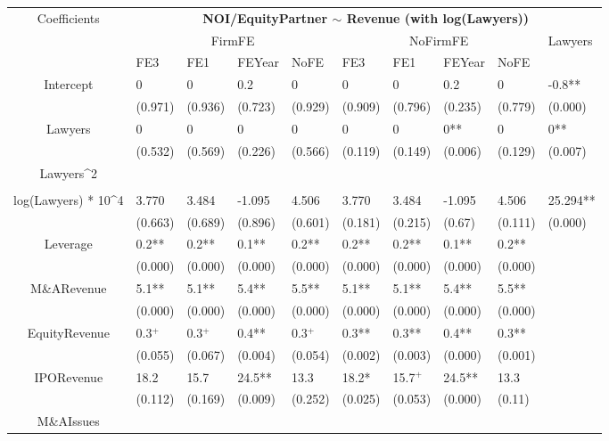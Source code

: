 \documentclass{article}
\begin{document}
\begin{table}[H]
\centering
\begin{tabular}{|clllllllll|}
\hline
\multirow{3}{*}{Coefficients} & \multicolumn{9}{c|}{\textbf{NOI/EquityPartner $\sim$ Revenue (with log(Lawyers))}} \\
\cline{2-10}
& \multicolumn{4}{c}{FirmFE} & \multicolumn{4}{c}{NoFirmFE} & \multirow{2}{*}{Lawyers} \\
\cline{2-9}
& FE3 & FE1 & FEYear & NoFE & FE3 & FE1 & FEYear & NoFE &  \\
\hline
 
Intercept & 0 & 0 & 0.2 & 0 & 0 & 0 & 0.2 & 0 & -0.8** \\ 
   & (0.971) & (0.936) & (0.723) & (0.929) & (0.909) & (0.796) & (0.235) & (0.779) & (0.000) \\ 
  Lawyers & 0 & 0 & 0 & 0 & 0 & 0 & 0** & 0 & 0** \\ 
   & (0.532) & (0.569) & (0.226) & (0.566) & (0.119) & (0.149) & (0.006) & (0.129) & (0.007) \\ 
  Lawyers^2 &  &  &  &  &  &  &  &  &  \\ 
   &  &  &  &  &  &  &  &  &  \\ 
  log(Lawyers) * 10^4 & 3.770 & 3.484 & -1.095 & 4.506 & 3.770 & 3.484 & -1.095 & 4.506 & 25.294** \\ 
   & (0.663) & (0.689) & (0.896) & (0.601) & (0.181) & (0.215) & (0.67) & (0.111) & (0.000) \\ 
  Leverage & 0.2** & 0.2** & 0.1** & 0.2** & 0.2** & 0.2** & 0.1** & 0.2** &  \\ 
   & (0.000) & (0.000) & (0.000) & (0.000) & (0.000) & (0.000) & (0.000) & (0.000) &  \\ 
  M\&ARevenue & 5.1** & 5.1** & 5.4** & 5.5** & 5.1** & 5.1** & 5.4** & 5.5** &  \\ 
   & (0.000) & (0.000) & (0.000) & (0.000) & (0.000) & (0.000) & (0.000) & (0.000) &  \\ 
  EquityRevenue & 0.3$^{+}$ & 0.3$^{+}$ & 0.4** & 0.3$^{+}$ & 0.3** & 0.3** & 0.4** & 0.3** &  \\ 
   & (0.055) & (0.067) & (0.004) & (0.054) & (0.002) & (0.003) & (0.000) & (0.001) &  \\ 
  IPORevenue & 18.2 & 15.7 & 24.5** & 13.3 & 18.2* & 15.7$^{+}$ & 24.5** & 13.3 &  \\ 
   & (0.112) & (0.169) & (0.009) & (0.252) & (0.025) & (0.053) & (0.000) & (0.11) &  \\ 
  M\&AIssues &  &  &  &  &  &  &  &  &  \\ 

\end{tabular}
\end{table}
\end{document}
